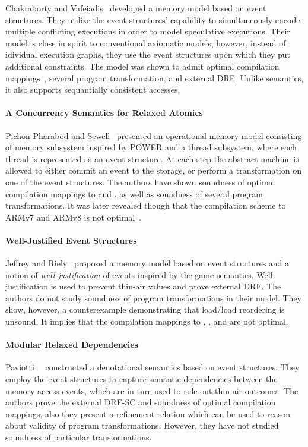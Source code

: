 Chakraborty and Vafeiadis~\cite{Chakraborty-Vafeiadis:CGO17, Chakraborty-Vafeiadis:POPL19}
developed a memory model based on event structures. 
They utilize the event structures' capability to simultaneously encode 
multiple conflicting executions in order to model speculative executions.
Their model is close in spirit to conventional axiomatic models, 
however, instead of idividual execution graphs, they use 
the event structures upon which they put additional constraints. 
The model was shown to admit optimal compilation mappings~\cite{Moiseenko-al:ECOOP20},
several program transformation, and external DRF.
Unlike \Promising semantics, it also supports 
sequantially consistent accesses.

\paragraph{A Concurrency Semantics for Relaxed Atomics}

Pichon-Pharabod and Sewell~\cite{PichonPharabod-Sewell:POPL16} 
presented an operational memory model consisting of 
memory subsystem inspired by POWER and a thread subsystem, 
where each thread is represented as an event structure. 
At each step the abstract machine is allowed to either 
commit an event to the storage, or perform a transformation 
on one of the event structures. 
The authors have shown soundness of 
optimal compilation mappings to \xTSO and \POWER, 
as well as soundness of several program transformations.
It was later revealed though that the compilation scheme
to ARMv7 and ARMv8 is not optimal~\cite{PichonPharabod:PhD18}.

\paragraph{Well-Justified Event Structures}

Jeffrey and Riely~\cite{Jeffrey-Riely:LICS16} proposed 
a memory model based on event structures and a notion of 
\emph{well-justification} of events inspired by the game semantics. 
Well-justification is used to prevent thin-air values 
and prove external DRF. The authors do not study 
soundness of program transformations in their model. 
They show, however, a counterexample demonstrating that 
load/load reordering is unsound. It implies that 
the compilation mappings to , , and \POWER are not optimal.   

\paragraph{Modular Relaxed Dependencies}

Paviotti~\etal~\cite{Paviotti-al:ESOP20} constructed a 
denotational semantics based on event structures. 
They employ the event structures to capture 
semantic dependencies between the memory access events, 
which are in ture used to rule out thin-air outcomes.
The authors prove the external DRF-SC and 
soundness of optimal compilation mappings,
also they present a refinement relation which 
can be used to reason about validity of program transformations. 
However, they have not studied soundness of particular transformations. 
